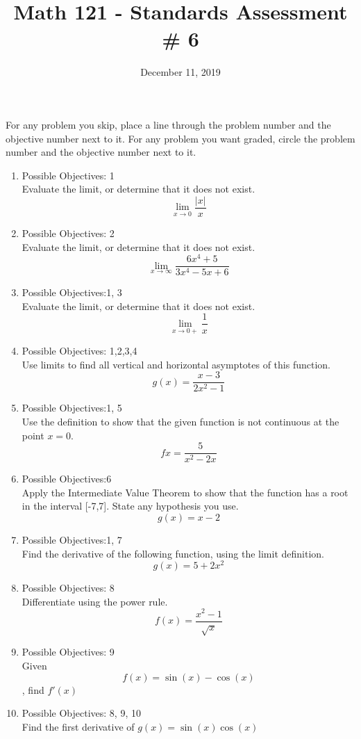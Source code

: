 \documentclass{exam}
\title{Math 121 - Standards Assessment \# 6}
\date{December 11, 2019}
\begin{document}
\maketitle
\bigskip

\begin{center}
\large
    For any problem you skip, place a line through the problem number and the objective number next to it. For any problem you want graded, circle the problem number and the objective number next to it.
\end{center}
\normalsize

\begin{enumerate}
\item Possible Objectives: 1\\
Evaluate the limit, or determine that it does not exist.
$$\lim_{x \rightarrow 0} \frac{|x|}{x}$$
\item Possible Objectives: 2\\
Evaluate the limit, or determine that it does not exist.
$$\lim_{x\rightarrow \infty} \frac{6x^4 + 5}{3x^4 - 5x + 6}$$
\item Possible Objectives:1, 3\\
Evaluate the limit, or determine that it does not exist.
$$\lim_{x \rightarrow 0+} \frac{1}{x}$$
\item Possible Objectives: 1,2,3,4\\
Use limits to find all vertical and horizontal asymptotes of this function.
$$g(x) = \frac{x-3}{2x^2 -1}$$
\item Possible Objectives:1, 5\\
Use the definition to show that the given function is not continuous at the point $x = 0$.
$$f{x} = \frac{5}{x^2 - 2x}$$
\item Possible Objectives:6\\
Apply the Intermediate Value Theorem to show that the function has a root in the interval [-7,7]. State any hypothesis you use.
$$g(x) = x-2$$
\item Possible Objectives:1, 7\\
Find the derivative of the following function, using the limit definition.
$$g(x) = 5 + 2x^2$$
\item Possible Objectives: 8\\
Differentiate using the power rule. 
$$f(x) = \frac{x^2 -1}{\sqrt{x}}$$
\item Possible Objectives: 9\\
Given $$f(x) = \sin(x) - \cos(x)$$, find $f'(x)$
\item Possible Objectives: 8, 9, 10\\
Find the first derivative of $g(x) = \sin(x)\cos(x)$


\end{enumerate}
\end{document}
